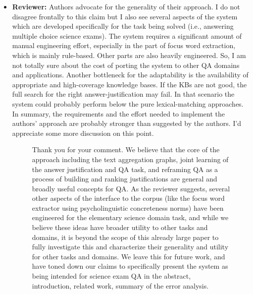 \documentclass[10pt]{article}
\newcommand{\todo}[1]{\textcolor{red}{TODO: #1}}
\begin{document}
\begin{itemize}

\item \textbf{Reviewer:} Authors advocate for the generality of their approach. I do not disagree
frontally to this claim but I also see several aspects of the system which
are developed specifically for the task being solved (i.e., answering
multiple choice science exams). The system requires a significant amount of
manual engineering effort, especially in the part of focus word extraction,
which is mainly rule-based. Other parts are also heavily engineered. So, I am
not totally sure about the cost of porting the system to other QA domains
and applications. Another bottleneck for the adaptability is the
availability of appropriate and high-coverage knowledge bases. If the KBs are
not good, the full search for the right answer-justification may fail. In
that scenario the system could probably perform below the pure
lexical-matching approaches. In summary, the requirements and the effort
needed to implement the authors' approach are probably stronger than
suggested by the authors. I'd appreciate some more discussion on this point.


\begin{figure}[H]
\caption{ Thank you for your comment.  We believe that the core of the approach including the text aggregation graphs, joint learning of the answer justification and QA task, and reframing QA as a process of building and ranking justifications are general and broadly useful concepts for QA.  As the reviewer suggests, several other aspects of the interface to the corpus (like the focus word extractor using psycholinguistic concreteness norms) have been engineered for the elementary science domain task, and while we believe these ideas have broader utility to other tasks and domains, it is beyond the scope of this already large paper to fully investigate this and characterize their generality and utility for other tasks and domains.  We leave this for future work, and have toned down our claims to specifically present the system as being intended for science exam QA in the abstract, introduction, related work, summary of the error analysis.}
\end{figure}


\end{itemize}
\end{document}
